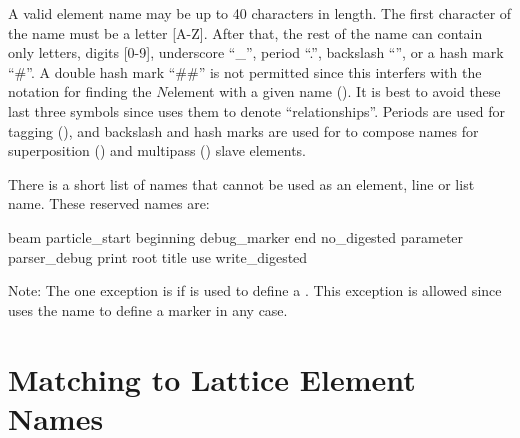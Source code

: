 A valid element name may be up to 40 characters in length. The first character of the name must be a
letter [A-Z]. After that, the rest of the name can contain only letters, digits [0-9], underscore
``_'', period ``.'', backslash ``\B'', or a hash mark ``\#''. A double hash mark ``\#\#'' is not
permitted since this interfers with the notation for finding the $N$\Th element with a given name
(). It is best to avoid these last three symbols since \bmad uses them to denote
``relationships''. Periods are used for tagging (), and backslash and hash marks are
used for to compose names for superposition () and multipass ()
slave elements.

There is a short list of names that cannot be used as an element, line or list name. These reserved names are:
\begin{example}
  beam
  particle_start
  beginning
  debug_marker
  end
  no_digested
  parameter
  parser_debug
  print
  root
  title
  use
  write_digested
\end{example}
Note: The one exception is if  is used to define a . This exception is allowed
since \bmad uses the  name to define a marker in any case.

\section{Matching to Lattice Element Names}
\label{s:ele.match}


